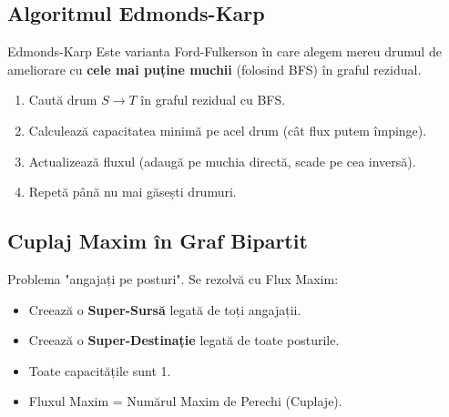 \documentclass[a4paper,10pt]{article}
\begin{document}
\subsection{Algoritmul Edmonds-Karp}
\begin{algorithmbox}{Edmonds-Karp}
Este varianta Ford-Fulkerson în care alegem mereu drumul de ameliorare cu \textbf{cele mai puține muchii} (folosind BFS) în graful rezidual.
\begin{enumerate}
    \item Caută drum $S \to T$ în graful rezidual cu BFS.
    \item Calculează capacitatea minimă pe acel drum (cât flux putem împinge).
    \item Actualizează fluxul (adaugă pe muchia directă, scade pe cea inversă).
    \item Repetă până nu mai găsești drumuri.
\end{enumerate}
\end{algorithmbox}

\subsection{Cuplaj Maxim în Graf Bipartit}
\begin{intuition}
Problema "angajați pe posturi". Se rezolvă cu Flux Maxim:
\begin{itemize}
    \item Creează o \textbf{Super-Sursă} legată de toți angajații.
    \item Creează o \textbf{Super-Destinație} legată de toate posturile.
    \item Toate capacitățile sunt 1.
    \item Fluxul Maxim = Numărul Maxim de Perechi (Cuplaje).
\end{itemize}
\end{intuition}

\begin{center}
\end{center}
\end{document}
